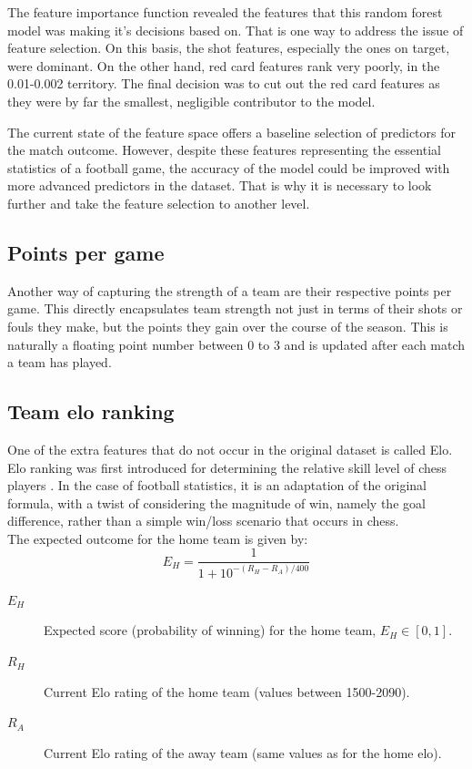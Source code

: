 \documentclass{article}
\begin{document}
The feature importance function revealed the features that this random forest model was making it's decisions based on. That is one way to address the issue of feature selection. On this basis, the shot features, especially the ones on target, were dominant. On the other hand, red card features rank very poorly, in the 0.01-0.002 territory. The final decision was to cut out the red card features as they were by far the smallest, negligible contributor to the model.

The current state of the feature space offers a baseline selection of predictors for the match outcome. However, despite these features representing the essential statistics of a football game, the accuracy of the model could be improved with more advanced predictors in the dataset. That is why it is necessary to look further and take the feature selection to another level. 


\subsection{Points per game}
Another way of capturing the strength of a team are their respective points per game. This directly encapsulates team strength not just in terms of their shots or fouls they make, but the points they gain over the course of the season. This is naturally a floating point number between 0 to 3 and is updated after each match a team has played.


\subsection{Team elo ranking}
One of the extra features that do not occur in the original dataset is called Elo. Elo ranking was first introduced for determining the relative skill level of chess players \cite{ELO}. In the case of football statistics, it is an adaptation of the original formula, with a twist of considering the magnitude of win, namely the goal difference, rather than a simple win/loss scenario that occurs in chess. 
\\
The expected outcome for the home team is given by:
\begin{equation}
E_H = \frac{1}{1 + 10^{-\left(R_H - R_A\right)/400}}
\end{equation}

\begin{description}
    \item[$E_H$] Expected score (probability of winning) for the home team, $E_H \in [0,1]$.
    \item[$R_H$] Current Elo rating of the home team (values between 1500-2090).
    \item[$R_A$] Current Elo rating of the away team (same values as for the home elo).
\end{description}
\end{document}
